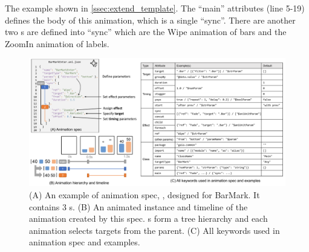 
The example shown in \autoref{ssec:extend_template}. The ``main'' attributes (line 5-19) defines the body of this animation, which is a single \aniunit{} ``sync''. There are another two \aniunit{}s are defined into ``sync'' which are the Wipe animation of bars and the ZoomIn animation of labels.

\begin{figure}[h]
  \centering
  \includegraphics[width=\linewidth]{figs/ani_spec.pdf}
  \caption{
  (A) An example of \gaia{} animation spec, \ie \aniclass{}, designed for BarMark. It contains 3 \aniunit{}s. 
  (B) An animated instance and timeline of the animation created by this spec. \aniunit{}s form a tree hierarchy and each animation selects targets from the parent. 
  (C) All keywords used in \gaia{} animation spec and examples. }
  \label{fig:ani_spec}
\end{figure}

